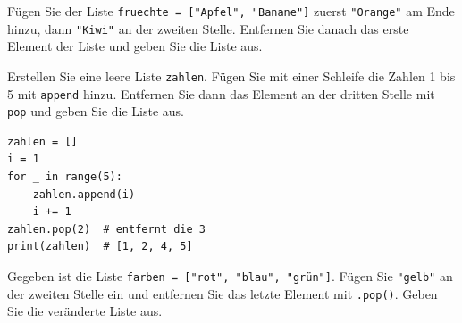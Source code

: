 \begin{myexercise}
	Fügen Sie der Liste \lstinline|fruechte = ["Apfel", "Banane"]| zuerst \lstinline|"Orange"| am Ende hinzu, dann \lstinline|"Kiwi"| an der zweiten Stelle. Entfernen Sie danach das erste Element der Liste und geben Sie die Liste aus.

	\begin{myanswer}
		
	\end{myanswer}
\end{myexercise}

\begin{myexercise}
	Erstellen Sie eine leere Liste \lstinline|zahlen|. Fügen Sie mit einer Schleife die Zahlen 1 bis 5 mit \lstinline|append| hinzu. Entfernen Sie dann das Element an der dritten Stelle mit \lstinline|pop| und geben Sie die Liste aus.

	\begin{myanswer}
		\begin{lstlisting}
zahlen = []
i = 1
for _ in range(5):
    zahlen.append(i)
    i += 1
zahlen.pop(2)  # entfernt die 3
print(zahlen)  # [1, 2, 4, 5]
\end{lstlisting}
	\end{myanswer}
\end{myexercise}

\begin{myexercise}
	Gegeben ist die Liste \lstinline|farben = ["rot", "blau", "grün"]|. Fügen Sie \lstinline|"gelb"| an der zweiten Stelle ein und entfernen Sie das letzte Element mit \lstinline|.pop()|. Geben Sie die veränderte Liste aus.

	\begin{myanswer}
		
	\end{myanswer}
\end{myexercise}

